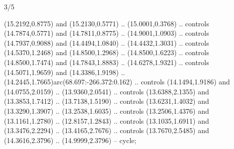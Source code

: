 \begin{flagdescription}{3/5}
\begin{scope}[shift={(0.5\flaglength,0.5\flagwidth)},scale=\flagwidth/51.2]
\begin{scope}[y=-1mm,x=1mm,shift={(-15,-9)},line join=round]
\begin{scope}[draw=black,line width=0.012\lw]
  (15.2192,0.8775) and (15.2130,0.5771) .. (15.0001,0.3768) .. controls
  (14.7874,0.5771) and (14.7811,0.8775) .. (14.9001,1.0903) .. controls
  (14.7937,0.9088) and (14.4494,1.0840) .. (14.4432,1.3031) .. controls
  (14.5370,1.2468) and (14.8500,1.2968) .. (14.8500,1.6223) .. controls
  (14.8500,1.7474) and (14.7843,1.8883) .. (14.6278,1.9321) .. controls
  (14.5071,1.9659) and (14.3386,1.9198) ..
  (14.2445,1.7665)arc(68.697:-266.372:0.162) .. controls (14.1494,1.9186) and
  (14.0755,2.0159) .. (13.9360,2.0541) .. controls (13.6388,2.1355) and
  (13.3853,1.7412) .. (13.7138,1.5190) .. controls (13.6231,1.4032) and
  (13.3290,1.3907) .. (13.2538,1.6035) .. controls (13.2506,1.4376) and
  (13.1161,1.2780) .. (12.8157,1.2843) .. controls (13.1035,1.6911) and
  (13.3476,2.2294) .. (13.4165,2.7676) .. controls (13.7670,2.5485) and
  (14.3616,2.3796) .. (14.9999,2.3796) -- cycle;
\leo
\begin{scope}[cm={{0.9,0,0,0.9,(1.45342,1.67136)}}]\leo\end{scope}
\begin{scope}[cm={{0.67,0,0,0.75,(4.90869,3.35378)}}]\leo\end{scope}
\end{scope}
\end{scope}
\end{scope}
\framecode{}
\end{flagdescription}
